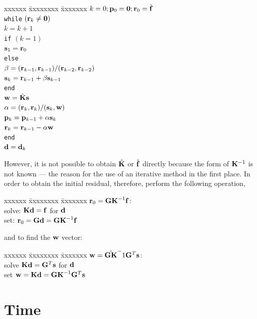 \documentclass[10pt]{article}
\begin{document}
	\begin{tabbing}
	  xxxxxx \= xxxxxxxx \= xxxxxxx \kill 
	  $ k = 0; {\bf p}_0 = {\bf 0}; {\bf r}_0 = \hat{\bf f}$ \\
	  {\tt while} $({\bf r}_k \not= {\bf 0})$ \\
	  \> $ k = k + 1 $\\
	  \> {\tt if} $(k=1)$ \\
	  \> \>$ {\bf s}_1 = {\bf r}_0$\\
	  \> {\tt else} \\
	  \> \> $\beta = ({\bf r}_{k-1},{\bf r}_{k-1})/({\bf r}_{k-2},{\bf r}_{k-2})$\\
	  \> \> ${\bf s}_k = {\bf r}_{k-1} + \beta {\bf s}_{k-1}$\\
	  \> {\tt end}\\
	  \> ${\bf w} = \hat{\bf K} {\bf s}$\\
	  \> $\alpha = ({\bf r}_{k},{\bf r}_{k})/({\bf s}_{k},{\bf w})$\\
	  \> ${\bf p}_k = {\bf p}_{k-1} + \alpha {\bf s}_{k}$\\
	  \> ${\bf r}_k = {\bf r}_{k-1} - \alpha {\bf w}$\\
	  {\tt end}\\
	  ${\bf d} = {\bf d}_k$
	\end{tabbing}
	
	However, it is not possible to obtain $\hat{\bf K}$ or $\hat{\bf f}$ directly
	because the form of ${\bf K}^{-1}$ is not known --- the reason for the
	use of an iterative method in the first place. In order to obtain the initial
	residual, therefore, perform the following operation,
	\begin{tabbing}
	  xxxxxx \= xxxxxxxx \= xxxxxxx \kill 
	  \> ${\bf r}_0 = {\bf G K}^{-1} {\bf f}$: \\
	  \> solve: ${\bf K d} = {\bf f}$ for $\bf d$\\
	  \> set: ${\bf r}_0 = {\bf G d} = {\bf G K}^{-1} {\bf f}$
	\end{tabbing}
	and to find the $\bf w$ vector:
	\begin{tabbing}
	  xxxxxx \= xxxxxxxx \= xxxxxxx \kill 
	  \> ${\bf w} = \hat{\bf G K}^-1{\bf G}^T {\bf s}$: \\
	  \> solve ${\bf K d} = {\bf G}^T {\bf s}$ for $\bf d$\\
	  \> set ${\bf w} = {\bf K d} = {\bf G K}^{-1}{\bf G}^T {\bf s}$
	\end{tabbing}


\section{Time}
\end{document}
